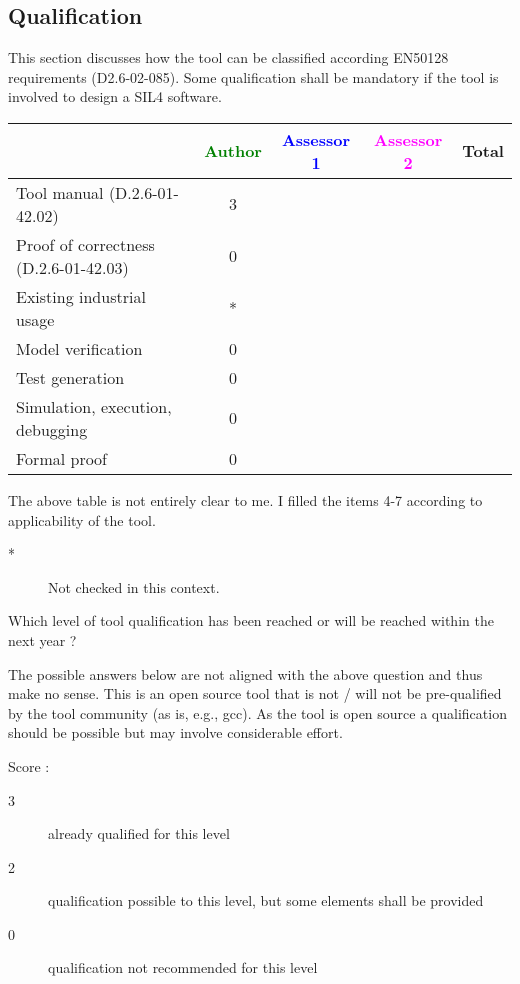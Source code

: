 \subsection{Qualification}

This section discusses how the tool can be classified according EN50128 requirements (D2.6-02-085). Some qualification shall be mandatory  if the tool is involved to design a SIL4 software.


\begin{tabular}{|l | c | c | c | c|}
\hline
& \textcolor{green}{Author} & \textcolor{blue}{Assessor 1} & \textcolor{magenta}{Assessor 2} & Total \\
\hline 
Tool manual (D.2.6-01-42.02) &3 & & &  \\
\hline
Proof of correctness (D.2.6-01-42.03)   &0 & & & \\
\hline
Existing industrial  usage  &* & & & \\
\hline
Model verification &0 & & & \\
\hline
Test generation &0 & & & \\
\hline
Simulation, execution, debugging &0 & & & \\
\hline
Formal proof &0 & & & \\
\hline
\end{tabular}

\begin{author_comment}
The above table is not entirely clear to me. I filled the items 4-7 according to applicability of the tool.
\begin{description}
\item[*] Not checked in this context.
\end{description}
\end{author_comment}

Which level of tool qualification has been reached or will be reached within the next year ?

\begin{author_comment}
The possible answers below are not aligned with the above question and thus make no sense. This is an open source tool that is not / will not be pre-qualified by the tool community (as is, e.g., gcc). As the tool is open source a qualification should be possible but may involve considerable effort.
\end{author_comment}

Score :
\begin{description}
\item[3] already qualified for this level
\item[2] qualification possible to this level, but some elements shall be provided
\item[0] qualification not recommended for this level
\end{description}


